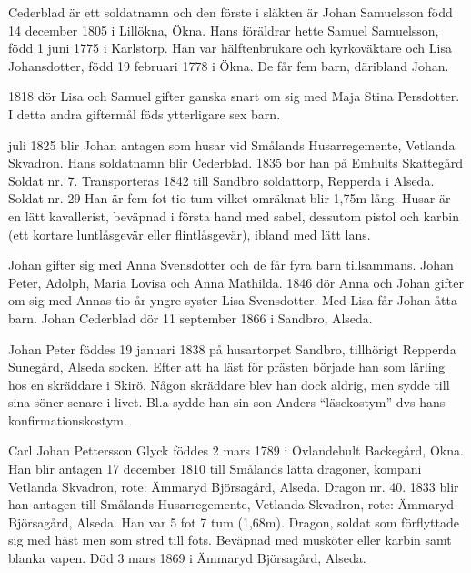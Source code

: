 

{\footline{}%

}


Cederblad är ett soldatnamn och den förste i släkten är Johan Samuelsson född 14 december 1805 i Lillökna, Ökna. Hans föräldrar hette Samuel Samuelsson, född 1 juni 1775 i Karlstorp. Han var hälftenbrukare och kyrkoväktare och Lisa Johansdotter, född 19 februari 1778 i Ökna. De får fem barn, däribland Johan.

1818 dör Lisa och Samuel gifter ganska snart om sig med Maja Stina Persdotter. I detta andra giftermål föds ytterligare sex barn.

 juli 1825 blir Johan antagen som husar vid Smålands Husar\-regemente, Vetlanda Skvadron. Hans soldatnamn blir Ceder\-blad. 1835 bor han på Emhults Skattegård Soldat nr. 7. Transporteras 1842 till Sandbro soldattorp, Repperda i Alseda. Soldat nr. 29 
Han är fem fot tio tum vilket omräknat blir 1,75m lång.
Husar är en lätt kavallerist, beväpnad i första hand med sabel, dessutom pistol och karbin (ett kortare luntlåsgevär eller flintlåsgevär), ibland med lätt lans.
\stopblockquote

Johan gifter sig med Anna Svensdotter och de får fyra barn tillsammans. Johan Peter, Adolph, Maria Lovisa och Anna Mathilda. 1846 dör Anna och Johan gifter om sig med Annas tio år yngre syster Lisa Svensdotter. Med Lisa får Johan åtta barn.
Johan Cederblad dör 11 september 1866 i Sandbro, Alseda.

Johan Peter föddes 19 januari 1838 på husartorpet Sandbro, tillhörigt Repperda Sunegård, Alseda socken.
Efter att ha läst för prästen började han som lärling hos en skräddare i Skirö. Någon skräddare blev han dock aldrig, men sydde till sina söner senare i livet. Bl.a sydde han sin son Anders “läsekostym” dvs hans konfirmationskostym.



Carl Johan Pettersson Glyck föddes 2 mars 1789 i Övlandehult Backegård, Ökna.
Han blir antagen 17 december 1810 till Smålands lätta dragoner, kompani Vetlanda Skvadron, rote: Ämmaryd Björsagård, Alseda. Dragon nr. 40.
1833 blir han antagen till Smålands Husarregemente, Vetlanda Skvadron, rote: Ämmaryd Björsagård, Alseda. Han var 5 fot 7 tum (1,68m).
Dragon, soldat som förflyttade sig med häst men som stred till fots. Beväpnad med musköter eller karbin samt blanka vapen.
Död 3 mars 1869 i Ämmaryd Björsagård, Alseda.

